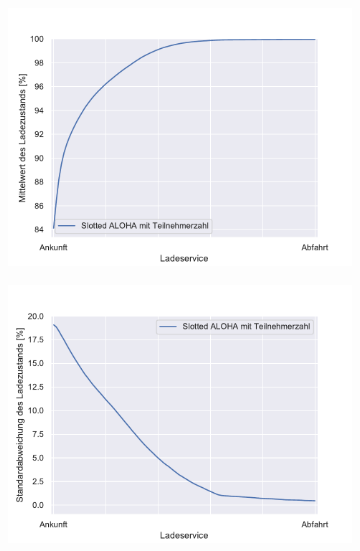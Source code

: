 \begin{figure}
	\begin{subfigure}{0.49\linewidth}
		\includegraphics[width=\linewidth]{img/SA_par_trafo/SlottedAloha_participants_VDE_tau_trafo_15_soc_mean.pdf}
        \label{ABB_SAparTrafo_SocMEAN}
	\end{subfigure}
	\begin{subfigure}{0.49\linewidth}
		\includegraphics[width=\linewidth]{img/SA_par_trafo/SlottedAloha_participants_VDE_tau_trafo_15_soc_std.pdf}
        \label{ABB_SAparTrafo_SocSTD}
	\end{subfigure}
\end{figure}
